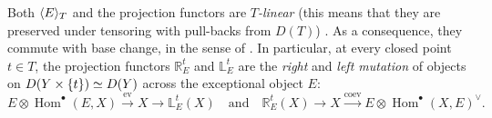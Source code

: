 \documentclass[11pt]{amsart}
\theoremstyle{definition}
\DeclareMathOperator{\Hom}{Hom}
\newcommand{\sT}{\mathcal{T}}
\newcommand{\st}{\,|\,}					%
\DeclarePairedDelimiter{\set}{\lbrace}{\rbrace}
\DeclarePairedDelimiter{\pair}{\langle}{\rangle}
\begin{document}
Both $\pair{E}_T$ and the projection functors are \emph{$T$-linear} (this means that they are preserved under tensoring with pull-backs from $D(T)$) \cite[\S 2.3, Corollary~5.9]{Kuz11_base_change}. As a consequence, they commute with base change, in the sense of \cite[\S 5]{Kuz11_base_change}. In particular,  at every closed point $t\in T$, the projection functors $\mathbb R_E^t$ and $\mathbb L_E^t$ are the \textit{right} and \textit{left mutation} of objects on $D(Y\times \set{t})\simeq D(Y)$ across the exceptional object $E$:
\[
 E\otimes \Hom^\bullet(E,X) \xrightarrow{\mathrm{ev}} X \to \mathbb L_E^t(X) \quad \text{and}\quad
  \mathbb R_E^t(X) \to X \xrightarrow{\mathrm{coev}} E\otimes \Hom^\bullet(X,E)^\vee. 
\]








\end{document}
